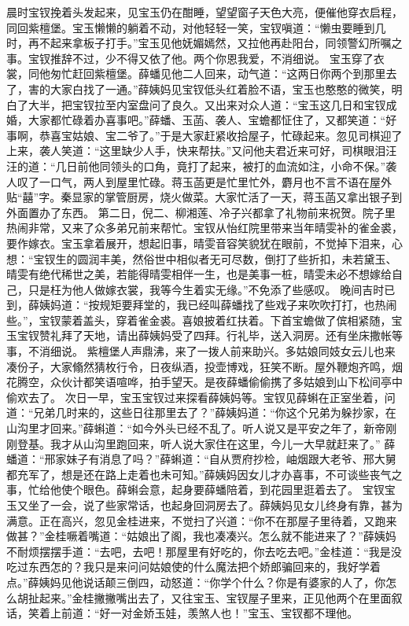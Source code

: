 \documentclass[12pt,oneside]{book}
\begin{document}
晨时宝钗挽着头发起来，见宝玉仍在酣睡，望望窗子天色大亮，便催他穿衣启程，同回紫檀堡。宝玉懒懒的躺着不动，对他轻轻一笑，宝钗嗔道：“懒虫要睡到几时，再不起来拿板子打手。”宝玉见他妩媚嫣然，又拉他再赴阳台，同领警幻所嘱之事。宝钗推辞不过，少不得又依了他。两个你恩我爱，不消细说。
宝玉穿了衣裳，同他匆忙赶回紫檀堡。薛蟠见他二人回来，动气道：“这两日你两个到那里去了，害的大家白找了一通。”薛姨妈见宝钗低头红着脸不语，宝玉也憨憨的微笑，明白了大半，把宝钗拉至内室盘问了良久。又出来对众人道：“宝玉这几日和宝钗成婚，大家都忙碌着办喜事吧。”薛蟠、玉菡、袭人、宝蟾都怔住了，又都笑道：“好事啊，恭喜宝姑娘、宝二爷了。”于是大家赶紧收拾屋子，忙碌起来。忽见司棋迎了上来，袭人笑道：“这里缺少人手，快来帮扶。”又问他夫君近来可好，司棋眼泪汪汪的道：“几日前他同领头的口角，竟打了起来，被打的血流如注，小命不保。”袭人叹了一口气，两人到屋里忙碌。蒋玉菡更是忙里忙外，麝月也不言不语在屋外贴“囍”字。秦显家的掌管厨房，烧火做菜。大家忙活了一天，蒋玉菡又拿出银子到外面置办了东西。
第二日，倪二、柳湘莲、冷子兴都拿了礼物前来祝贺。院子里热闹非常，又来了众多弟兄前来帮忙。宝钗从怡红院里带来当年晴雯补的雀金裘，要作嫁衣。宝玉拿着展开，想起旧事，晴雯音容笑貌犹在眼前，不觉掉下泪来，心想：“宝钗生的圆润丰美，然俗世中相似者无可尽数，倒打了些折扣，未若黛玉、晴雯有绝代稀世之美，若能得晴雯相伴一生，也是美事一桩，晴雯未必不想嫁给自己，只是枉为他人做嫁衣裳，我等今生着实无缘。”不免添了些感叹。
晚间吉时已到，薛姨妈道：“按规矩要拜堂的，我已经叫薛蟠找了些戏子来吹吹打打，也热闹些。”，宝钗蒙着盖头，穿着雀金裘。喜娘披着红扶着。下首宝蟾做了傧相紧随，宝玉宝钗赞礼拜了天地，请出薛姨妈受了四拜。行礼毕，送入洞房。还有坐床撒帐等事，不消细说。
紫檀堡人声鼎沸，来了一拨人前来助兴。多姑娘同妓女云儿也来凑份子，大家翛然猜枚行令，日夜纵酒，投壶博戏，狂笑不断。屋外鞭炮齐鸣，烟花腾空，众伙计都笑语喧哗，拍手望天。是夜薛蟠偷偷携了多姑娘到山下松间亭中偷欢去了。
次日一早，宝玉宝钗过来探看薛姨妈等。宝钗见薛蝌在正室坐着，问道：“兄弟几时来的，这些日往那里去了？”薛姨妈道：“你这个兄弟为躲抄家，在山沟里才回来。”薛蝌道：“如今外头已经不乱了。听人说又是平安之年了，新帝刚刚登基。我才从山沟里跑回来，听人说大家住在这里，今儿一大早就赶来了。”
薛蟠道：“邢家妹子有消息了吗？”薛蝌道：“自从贾府抄检，岫烟跟大老爷、邢大舅都充军了，想是还在路上走着也未可知。”薛姨妈因女儿才办喜事，不可谈些丧气之事，忙给他使个眼色。薛蝌会意，起身要薛蟠陪着，到花园里逛着去了。
宝钗宝玉又坐了一会，说了些家常话，也起身回洞房去了。薛姨妈见女儿终身有靠，甚为满意。正在高兴，忽见金桂进来，不觉扫了兴道：“你不在那屋子里待着，又跑来做甚？”金桂噘着嘴道：“姑娘出了阁，我也凑凑兴。怎么就不能进来了？”薛姨妈不耐烦摆摆手道：“去吧，去吧！那屋里有好吃的，你去吃去吧。”金桂道：“我是没吃过东西怎的？我只是来问问姑娘使的什么魔法把个娇郎骗回来的，我好学着点。”薛姨妈见他说话颠三倒四，动怒道：“你学个什么？你是有婆家的人了，你怎么胡扯起来。”金桂撇撇嘴出去了，又往宝玉、宝钗屋子里来，正见他两个在里面叙话，笑着上前道：“好一对金娇玉娃，羡煞人也！”宝玉、宝钗都不理他。
\end{document}
